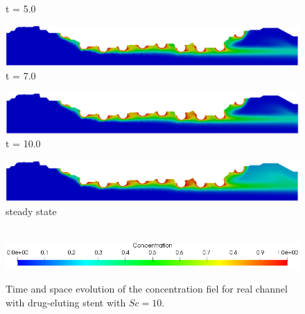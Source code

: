 \begin{figure}[H]
\begin{minipage}{.50\linewidth}
      t = 5.0
     \end{minipage}%
     \begin{minipage}{.50\linewidth}
      \centering
      \includegraphics[scale=0.18]{./02_chaps/cap_solution/figure/conc10_RealStrut6.png}\\
      t = 7.0
     \end{minipage}
     \begin{minipage}{.50\linewidth}
     \medskip
      \centering
      \includegraphics[scale=0.18]{./02_chaps/cap_solution/figure/conc10_RealStrut7.png}\\
      t = 10.0
     \end{minipage}%
     \begin{minipage}{.50\linewidth}
     \medskip
      \centering
      \includegraphics[scale=0.18]{./02_chaps/cap_solution/figure/conc10_RealStrut8.png}\\
      steady state
     \end{minipage}\\[10pt]
      \centering
      \includegraphics[scale=0.5]{./02_chaps/cap_solution/figure/conc1_RealStrutScale.png}\\
     \medskip
    \caption{
Time and space evolution of the concentration fiel for real channel with drug-eluting stent with $Sc=10$.}
     \label{conc field real stent sc 10}
\end{figure}



